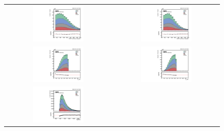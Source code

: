 \begin{figure}[t]
  \centering
  \begin{tabular}{cc}
    \includegraphics[width=0.5\textwidth]{Figures/dataMC_trig_antiDBT/puppiSDMassThea_j0.pdf} &
    \includegraphics[width=0.5\textwidth]{Figures/dataMC_trig_antiDBT/puppiSDMassThea_j1.pdf} \\
     \includegraphics[width=0.5\textwidth]{Figures/dataMC_trig_antiDBT/puppiTau21_j0.pdf} &
    \includegraphics[width=0.5\textwidth]{Figures/dataMC_trig_antiDBT/puppiTau21_j1.pdf} \\
     \includegraphics[width=0.5\textwidth]{Figures/dataMC_trig_antiDBT/totalMassRed.pdf} &

\end{tabular}
\end{figure}
